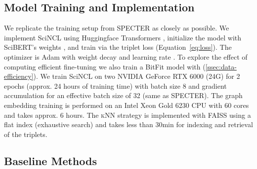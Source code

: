 \documentclass[11pt]{article}
\newcommand{\knn}{\textsc{kNN}\xspace}
\newcommand{\sys}{SciNCL\xspace} \newcommand{\baselineCount}{10\xspace}
\begin{document}
\subsection{Model Training and Implementation}\label{ssec:Train_implement}

We replicate the training setup from SPECTER as closely as possible.
We implement \sys using Huggingface Transformers \cite{Wolf2019}, initialize the model with SciBERT's weights \cite{Beltagy2019}, and train via the triplet loss (Equation~\ref{eq:loss}). 
The optimizer is Adam with weight decay \cite{Kingma2015,Loshchilov2019} and learning rate .
To explore the effect of computing efficient fine-tuning we also train a BitFit model \cite{Zaken2021} with  (\cref{ssec:data-efficiency}).
We train \sys on two NVIDIA GeForce RTX 6000 (24G) for 2 epochs (approx. 24 hours of training time) with batch size 8 and gradient accumulation for an effective batch size of 32 (same as SPECTER). 
The graph embedding training is performed on an Intel Xeon Gold 6230 CPU with 60 cores and takes approx. 6 hours.
The \knn strategy is implemented with FAISS \cite{Johnson2021} using a flat index (exhaustive search) and takes less than 30min for indexing and retrieval of the triplets.

\subsection{Baseline Methods} \label{ssec:baselines}
\end{document}
